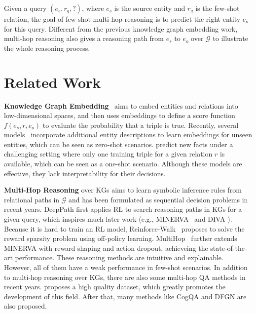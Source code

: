 \documentclass[11pt,a4paper]{article}
\begin{document}
Given a query $(e_s, r_q, ?)$, where $e_s$ is the source entity and $r_q$ is the few-shot relation, the goal of few-shot multi-hop reasoning is to predict the right entity $e_o$ for this query. Different from the previous knowledge graph embedding work, multi-hop reasoning also gives a reasoning path from $e_s$ to $e_o$ over $\mathcal{G}$ to illustrate the whole reasoning process.

\section{Related Work}

\textbf{Knowledge Graph Embedding}~\cite{TransE,DistMult,ConvE} aims to embed entities and relations into low-dimensional spaces, and then uses embeddings to define a score function $f(e_s, r, e_o)$ to evaluate the probability that a triple is true. Recently, several models~\cite{DKRL,shi2018open} incorporate additional entity descriptions to learn embeddings for unseen entities, which can be seen as zero-shot scenarios. \citet{one-shot} predict new facts under a challenging setting where only one training triple for a given relation $r$ is available, which can be seen as a one-shot scenario. Although these models are effective, they lack interpretability for their decisions.

\textbf{Multi-Hop Reasoning} over KGs aims to learn symbolic inference rules from relational paths in $\mathcal{G}$ and has been formulated as sequential decision problems in recent years. DeepPath \cite{DeepPath} first applies RL to search reasoning paths in KGs for a given query, which inspires much later work (e.g., MINERVA~\cite{MINERVA} and DIVA \cite{chen2018variational}). Because it is hard to train an RL model, Reinforce-Walk~\cite{shen2018reinforcewalk} proposes to solve the reward sparsity problem using off-policy learning. MultiHop~\cite{MultiHop} further extends MINERVA with reward shaping and action dropout, 
achieveing the state-of-the-art performance. These reasoning methods are intuitive and explainable. However, all of them have a weak performance in few-shot scenarios. In addition to multi-hop reasoning over KGs, there are also some multi-hop QA methods in recent years. \citet{yang2018hotpotqa} proposes a high quality dataset, which greatly promotes the development of this field. After that, many methods like CogQA \cite{CogQA} and DFGN \cite{DFGN} are also proposed.
\end{document}
